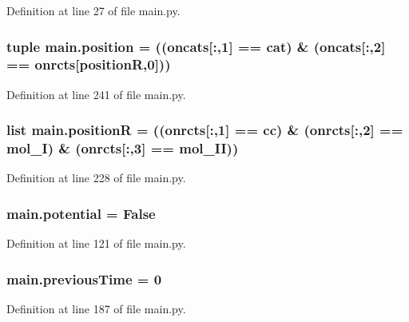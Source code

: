 Definition at line 27 of file main.\-py.

\hypertarget{a00151_ac67c60df3cc9afae7e4888d2b48b846d}{
\subsubsection[{position}]{\setlength{\rightskip}{0pt plus 5cm}tuple main.\-position = (({\bf oncats}\mbox{[}\-:,1\mbox{]} == {\bf cat}) \& ({\bf oncats}\mbox{[}\-:,2\mbox{]} == {\bf onrcts}\mbox{[}{\bf position\-R},0\mbox{]}))}}\label{a00151_ac67c60df3cc9afae7e4888d2b48b846d}


Definition at line 241 of file main.\-py.

\hypertarget{a00151_adbbdc0f6ad0f08400b3e492f7a807a6b}{
\subsubsection[{position\-R}]{\setlength{\rightskip}{0pt plus 5cm}list main.\-position\-R = (({\bf onrcts}\mbox{[}\-:,1\mbox{]} == {\bf cc}) \& ({\bf onrcts}\mbox{[}\-:,2\mbox{]} == {\bf mol\-\_\-\-I}) \& ({\bf onrcts}\mbox{[}\-:,3\mbox{]} == {\bf mol\-\_\-\-I\-I}))}}\label{a00151_adbbdc0f6ad0f08400b3e492f7a807a6b}


Definition at line 228 of file main.\-py.

\hypertarget{a00151_abe4c267a63409b1b7cd9c6aaf0779b4a}{
\subsubsection[{potential}]{\setlength{\rightskip}{0pt plus 5cm}main.\-potential = False}}\label{a00151_abe4c267a63409b1b7cd9c6aaf0779b4a}


Definition at line 121 of file main.\-py.

\hypertarget{a00151_a6a6de947e3b6ada5ea6e761d208228bd}{
\subsubsection[{previous\-Time}]{\setlength{\rightskip}{0pt plus 5cm}main.\-previous\-Time = 0}}\label{a00151_a6a6de947e3b6ada5ea6e761d208228bd}


Definition at line 187 of file main.\-py.

